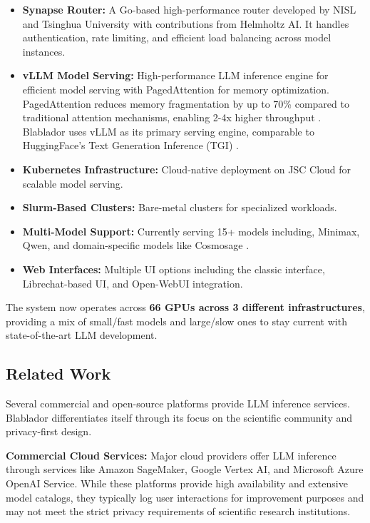 \documentclass[10pt,conference]{IEEEtran}
\begin{document}
\begin{itemize}
    \item \textbf{Synapse Router:} A Go-based high-performance router developed by NISL and Tsinghua University \cite{synapse} with contributions from Helmholtz AI. It handles authentication, rate limiting, and efficient load balancing across model instances.
    \item \textbf{vLLM Model Serving:} High-performance LLM inference engine \cite{vllm} for efficient model serving with PagedAttention for memory optimization. PagedAttention reduces memory fragmentation by up to 70\% compared to traditional attention mechanisms, enabling 2-4x higher throughput \cite{vllm}. Blablador uses vLLM as its primary serving engine, comparable to HuggingFace's Text Generation Inference (TGI) \cite{tgi}.
    \item \textbf{Kubernetes Infrastructure:} Cloud-native deployment on JSC Cloud for scalable model serving.
    \item \textbf{Slurm-Based Clusters:} Bare-metal clusters for specialized workloads.
    \item \textbf{Multi-Model Support:} Currently serving 15+ models including, Minimax, Qwen, and domain-specific models like Cosmosage \cite{dehaan2024cosmosage}.
    \item \textbf{Web Interfaces:} Multiple UI options including the classic interface, Librechat-based UI, and Open-WebUI integration.
\end{itemize}

The system now operates across \textbf{66 GPUs across 3 different infrastructures}, providing a mix of small/fast models and large/slow ones to stay current with state-of-the-art LLM development.

\subsection{Related Work}

Several commercial and open-source platforms provide LLM inference services. Blablador differentiates itself through its focus on the scientific community and privacy-first design.

\textbf{Commercial Cloud Services:} Major cloud providers offer LLM inference through services like Amazon SageMaker, Google Vertex AI, and Microsoft Azure OpenAI Service. While these platforms provide high availability and extensive model catalogs, they typically log user interactions for improvement purposes and may not meet the strict privacy requirements of scientific research institutions.
\end{document}
